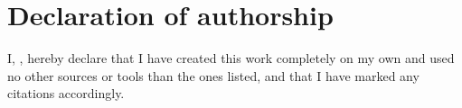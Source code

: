 \chapter*{Declaration of authorship}

I, \theauthor, hereby declare that I have created this work completely on my own and
used no other sources or tools than the ones listed, and that I have marked
any citations accordingly.

\begin{minipage}[c]{\textwidth}
    \vspace{2cm}
    \makebox[\textwidth][c]{
        \makebox[.6\textwidth][l] {\textrm{\theplace, \thedate}}
        \hfill
        \makebox[.4\textwidth][c] {\hrulefill}
        \hfill
    }
    \makebox[\textwidth][c]{
        \hfill
        \makebox[.6\textwidth][c] {}
        \emph{\theauthor}
        \hfill
    }
\end{minipage}
